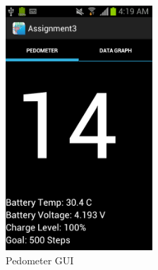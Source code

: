 \documentclass[conference]{IEEEtran}
\begin{document}
\begin{figure}
\centering
\includegraphics[width=5.5cm]{PedometerGUI.png}
\caption{\scriptsize  Pedometer GUI}
\label{Pedgui}
\end{figure}
\end{document}
